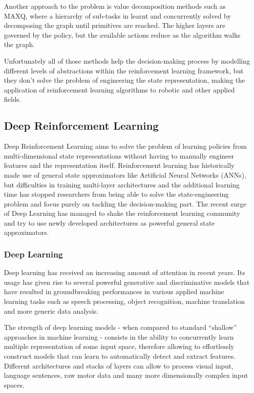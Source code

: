 
Another approach to the problem is value decomposition methods such as MAXQ,
where a hierarchy of sub-tasks in learnt and concurrently solved by decomposing
the graph until primitives are reached. The higher layers are governed by the
policy, but the available actions reduce as the algorithm walks the graph.


Unfortunately all of those methods help the decision-making process by modelling
different levels of abstractions within the reinforcement learning framework,
but they don't solve the problem of engineering the state representation, making
the application of reinforcement learning algorithms to robotic and other
applied fields.

\subsection{Deep Reinforcement Learning}

Deep Reinforcement Learning aims to solve the problem of learning policies from
multi-dimensional state representations without having to manually engineer
features and the representation itself. Reinforcement learning has historically
made use of general state approximators like Artificial Neural Networks (ANNs),
but difficulties in training multi-layer architectures and the additional
learning time has stopped researchers from being able to solve the
state-engineering problem and focus purely on tackling the decision-making part.
The recent surge of Deep Learning has managed to shake the reinforcement
learning community and try to use newly developed architectures as powerful
general state approximators.

\subsubsection{Deep Learning}

Deep learning has received an increasing amount of attention in recent years.
Its usage has given rise to several powerful generative and discriminative
models that have resulted in groundbreaking performances in various applied
machine learning tasks such as speech processing, object recognition, machine
translation and more generic data analysis.

The strength of deep learning models - when compared to standard ``shallow''
approaches in machine learning - consists in the ability to concurrently learn
multiple representation of some input space, therefore allowing to effortlessly
construct models that can learn to automatically detect and extract features.
Different architectures and stacks of layers can allow to process visual input,
language sentences, raw motor data and many more dimensionally complex input
spaces.

